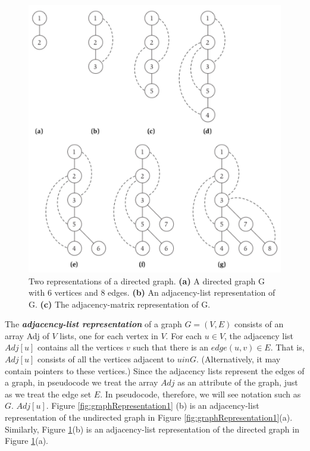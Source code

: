 \documentclass[12pt,a4paper]{book}
\begin{document}
\begin{figure}[h]
    \centering
    \label{fig:graphRepresentation2}
    \includegraphics[width=\textwidth]{graphRepresentation2}
    \caption{ Two representations of a directed graph. \textbf{(a)} A directed graph G with 6 vertices and 8 edges. \textbf{(b)} An adjacency-list representation of G. \textbf{(c)} The adjacency-matrix representation of G.}
\end{figure}
The \textbf{\textit{adjacency-list representation}} of a graph $G = (V,E)$ consists of an array Adj of $V$ lists, one for each vertex in $V$. For each $u \in V$, the adjacency list $Adj[u]$ contains all the vertices $v$ such that there is an $edge (u,v) \in E$. That is, $Adj[u]$ consists of all the vertices adjacent to $u in G$. (Alternatively, it may contain pointers to these vertices.) Since the adjacency lists represent the edges of a graph, in pseudocode we treat the array $Adj$ as an attribute of the graph, just as we treat the edge set $E$. In pseudocode, therefore, we will see notation such as $G$. $Adj[u]$. Figure \ref{fig:graphRepresentation1} (b) is an adjacency-list representation of the undirected graph in Figure \ref{fig:graphRepresentation1}(a). Similarly, Figure \ref{fig:graphRepresentation2}(b) is an adjacency-list representation of the directed graph in Figure \ref{fig:graphRepresentation2}(a).\par
\end{document}
